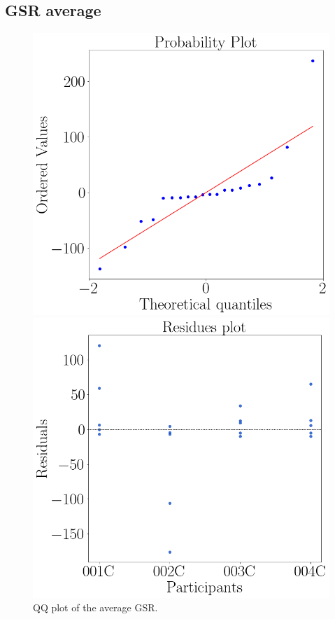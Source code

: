 \subsection{GSR average}
    \begin{figure}[!htb]
        \begin{minipage}{0.45\linewidth}
            \centering
            \includegraphics[width = \linewidth]{Resultados/GSR/Figuras/png/qqplot_gsr_avg.png}
            \caption{QQ plot of the average GSR.}
            \label{fig:qqplot_bom_average}
        \end{minipage}
        \begin{minipage}{0.1\linewidth}
            \hfill
        \end{minipage}
        \begin{minipage}{0.45\linewidth}
            \centering
            \includegraphics[width = \linewidth]{Resultados/GSR/Figuras/png/residplot_gsr_avg.png}

\end{minipage}
\end{figure}

